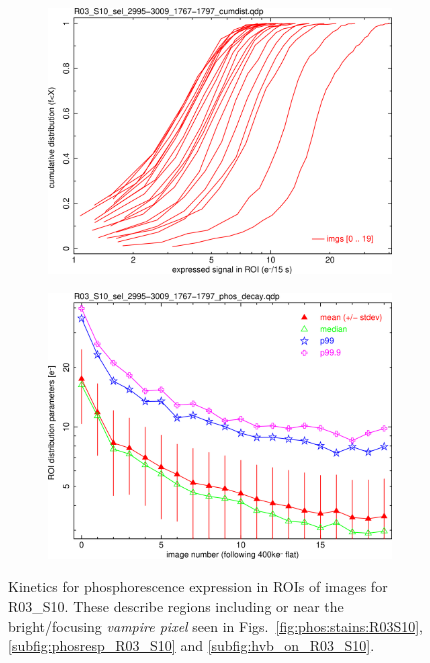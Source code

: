 \begin{figure}[!htbp]
\begin{subfigure}{0.45\textwidth}
  \includegraphics[width=\textwidth]{figures/phosphorescence-survey/phos_kinetics/R03_S10_sel_2995-3009_1767-1797_cumdist.png}    
\end{subfigure}
\hfil
\begin{subfigure}{0.45\textwidth}
  \centering
  \includegraphics[width=\textwidth]{figures/phosphorescence-survey/phos_kinetics/R03_S10_sel_2995-3009_1767-1797_phos_decay.png}
\end{subfigure}
\newline
\caption{Kinetics for phosphorescence expression in ROIs of images for R03\_S10. These describe regions including or near the bright/focusing {\it vampire pixel} seen in Figs.~\ref{fig:phos:stains:R03S10}, \ref{subfig:phosresp_R03_S10} and \ref{subfig:hvb_on_R03_S10}.}
\label{fig:phos:kinetics:R03S10}
\end{figure}

